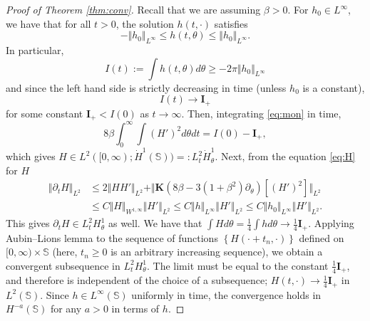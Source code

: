 \documentclass[JEP,XML,SOM,Unicode,NoFloatCountersInSection,published]{cedram}
\theoremstyle{plain}
\theoremstyle{definition}
\newcommand{\nrm}[1]{\Vert#1\Vert}
\let\rd\partial
\let\bt\beta
\let\tht\theta
\newcommand{\bfI}{{\mathbf I}}
\newcommand{\bfK}{{\mathbf K}}
\newcommand{\bbS}{\mathbb S}
\begin{document}
\begin{proof}[Proof of Theorem \ref{thm:conv}]
Recall that we are assuming $\bt>0$. For $h_0 \in L^\infty$, we have that for all $t>0$, the solution $h(t,\cdot)$ satisfies
\begin{equation*}
-\nrm{h_0}_{L^\infty} \le h(t,\tht) \le \nrm{h_0}_{L^\infty}.
\end{equation*}
In particular,
\begin{equation*}
I(t) := \int h(t,\tht) d\tht \ge -2\pi\nrm{h_0}_{L^\infty}
\end{equation*}
and since the left hand side is strictly decreasing in time (unless $h_0$ is a constant),
\begin{equation*}
I(t) \to \bfI_{+}
\end{equation*}
for some constant $\bfI_{+} < I(0)$ as $t\to\infty$. Then, integrating \eqref{eq:mon} in time,
\begin{equation*}
8\bt\int_0^\infty \int (H')^2 d\tht dt = I(0) - \bfI_{+},
\end{equation*}
which gives $H \in L^2([0,\infty); \dot{H}^1(\bbS)) =: L^2_t \dot{H}^1_\tht$. Next, from the equation \eqref{eq:H} for $H$
\begin{equation*}
\begin{split}
\nrm{\rd_tH}_{L^2} &\le 2\nrm{H H'}_{L^2} + \nrm{\bfK(8\bt - 3(1+\bt^2)\rd_\tht)\left[ (H')^2 \right]}_{L^2} \\
&\le C \nrm{H}_{W^{1,\infty}} \nrm{H'}_{L^2} \le C \nrm{h}_{L^\infty} \nrm{H'}_{L^2} \le C \nrm{h_0}_{L^{\infty}} \nrm{H'}_{L^2}.
\end{split}
\end{equation*}
This gives $\rd_tH \in L^2_tH^1_\tht$ as well. We have that $\int H d\tht = \frac14 \int h d\tht \to \frac14 \bfI_{+}$. Applying Aubin--Lions lemma to the sequence of functions $\left\{ H(\cdot+t_n, \cdot) \right\}$ defined on $[0,\infty)\times\bbS$ (here, $t_n\ge0 $ is an arbitrary increasing sequence), we obtain a convergent subsequence in $L^2_tH^1_\tht$. The limit must be equal to the constant $\frac14 \bfI_{+}$, and therefore is independent of the choice of a subsequence; $H(t,\cdot)\to \frac14 \bfI_{+}$ in $L^2(\bbS)$. Since $h\in L^\infty(\bbS)$ uniformly in time, the convergence holds in $H^{-a}(\bbS)$ for any $a>0$ in terms of $h$.
\end{proof}
\end{document}
